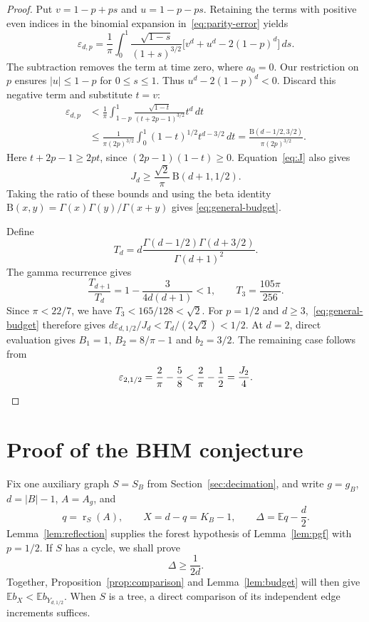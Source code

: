 \documentclass[11pt,reqno]{amsart}
\theoremstyle{remark}
\numberwithin{equation}{section}
\newcommand{\E}{\mathbb E}
\DeclareMathOperator{\rk}{r}
\begin{document}
\begin{proof}
Put $v=1-p+ps$ and $u=1-p-ps$. Retaining the terms with positive even indices in the
binomial expansion in~\eqref{eq:parity-error} yields
\begin{equation}\label{eq:epsilon-integral}
 \varepsilon_{d,p}=\frac1\pi\int_0^1
 \frac{\sqrt{1-s}}{(1+s)^{3/2}}
 \bigl[v^d+u^d-2(1-p)^d\bigr]\,ds.
\end{equation}
The subtraction removes the term at time zero, where $a_0=0$.
Our restriction on $p$ ensures $|u|\le1-p$ for $0\le s\le1$.
Thus $u^d-2(1-p)^d<0$. Discard this negative term and substitute $t=v$:
\begin{align*}
 \varepsilon_{d,p}
 &<\frac1\pi\int_{1-p}^1
       \frac{\sqrt{1-t}}{(t+2p-1)^{3/2}}t^d\,dt\\
 &\le\frac{1}{\pi(2p)^{3/2}}
       \int_0^1(1-t)^{1/2}t^{d-3/2}\,dt
  =\frac{\mathrm B(d-1/2,3/2)}{\pi(2p)^{3/2}}.
\end{align*}
Here $t+2p-1\ge2pt$, since $(2p-1)(1-t)\ge0$.
Equation~\eqref{eq:J} also gives
\[
 J_d\ge\frac{\sqrt2}{\pi}\,\mathrm B(d+1,1/2).
\]
Taking the ratio of these bounds and using the beta identity
$\mathrm B(x,y)=\Gamma(x)\Gamma(y)/\Gamma(x+y)$ gives
\eqref{eq:general-budget}.

Define
\begin{equation}\label{eq:T}
 T_d=d\frac{\Gamma(d-1/2)\Gamma(d+3/2)}{\Gamma(d+1)^2}.
\end{equation}
The gamma recurrence gives
\begin{equation}\label{eq:T-recurrence}
 \frac{T_{d+1}}{T_d}=1-\frac{3}{4d(d+1)}<1,
 \qquad T_3=\frac{105\pi}{256}.
\end{equation}
Since $\pi<22/7$, we have $T_3<165/128<\sqrt2$.
For $p=1/2$ and $d\ge3$,~\eqref{eq:general-budget} therefore gives
$d\varepsilon_{d,1/2}/J_d<T_d/(2\sqrt2)<1/2$.
At $d=2$, direct evaluation gives $B_1=1$, $B_2=8/\pi-1$ and
$b_2=3/2$. The remaining case follows from
\[
 \varepsilon_{2,1/2}=\frac2\pi-\frac58
 <\frac2\pi-\frac12=\frac{J_2}{4}.\qedhere
\]
\end{proof}

\section{Proof of the BHM conjecture}\label{sec:bhmproof}

Fix one auxiliary graph $S=S_B$ from Section~\ref{sec:decimation}, and
write $g=g_B$, $d=|B|-1$, $A=A_g$, and
\begin{equation}\label{eq:bhm-rank-notation}
 q=\rk_S(A),\qquad X=d-q=K_B-1,\qquad
 \Delta=\E q-\frac d2.
\end{equation}
Lemma~\ref{lem:reflection} supplies the forest hypothesis of
Lemma~\ref{lem:pgf} with $p=1/2$. If $S$ has a cycle, we shall prove
\begin{equation}\label{eq:bhm-surplus-target}
 \Delta\ge\frac{1}{2d}.
\end{equation}
Together, Proposition~\ref{prop:comparison} and Lemma~\ref{lem:budget}
will then give $\E b_X<\E b_{Y_{d,1/2}}$. When $S$ is a tree, a direct
comparison of its independent edge increments suffices.
\end{document}
